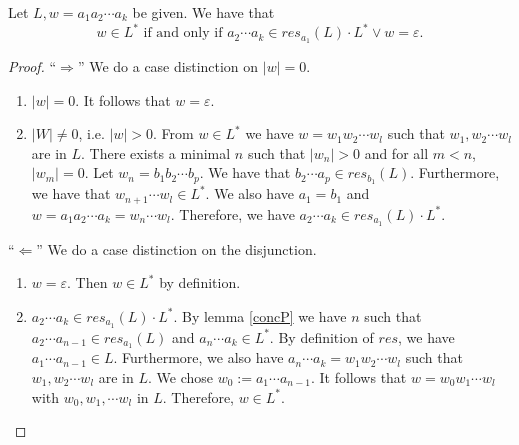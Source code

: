 
    \begin{lemma}
        \label{starP}
        Let $L, w = a_1 a_2 \cdots a_k$ be given. We have that
        \begin{equation*}
            w \in L^*   
            \mbox{ if and only if } 
            a_2 \cdots a_k \in res_{a_1}(L) \cdot L^* \vee w = \varepsilon.
        \end{equation*}
    \end{lemma}
    \begin{proof}
        ``$\Rightarrow$'' 
        We do a case distinction on $|w| = 0$.
        \begin{enumerate}
            \item
                $|w| = 0$. It follows that $w = \varepsilon$.
            \item
                $|W| \neq 0$, i.e. $|w| > 0$.
                From $w \in L^*$ we have $w = w_1 w_2 \cdots w_l$ such that $w_1, w_2 \cdots w_l$ are in $L$.
                There exists a minimal $n$ such that $|w_n| > 0$ and for all $m < n$, $|w_m| = 0$.
                Let $w_n = b_1 b_2 \cdots b_p$. We have that $b_2 \cdots a_p \in res_{b_1}(L)$.
                Furthermore, we have that $w_{n+1} \cdots w_l \in L^*$.
                We also have $a_1 = b_1$ and $w = a_1 a_2 \cdots a_k = w_n \cdots w_l$. 
                Therefore, we have $a_2 \cdots a_k \in res_{a_1}(L) \cdot L^*$.
        \end{enumerate}
        ``$\Leftarrow$'' 
        We do a case distinction on the disjunction.
        \begin{enumerate}
            \item
                $w = \varepsilon$. Then $w \in L^*$ by definition.
            \item
                $a_2 \cdots a_k \in res_{a_1}(L) \cdot L^*$. 
                By lemma \ref{concP} we have $n$ such that $a_2 \cdots a_{n-1} \in res_{a_1}(L)$ and $a_n \cdots a_k \in L^*$.
                By definition of $res$, we have $a_1 \cdots a_{n-1} \in L$.
                Furthermore, we also have $a_n \cdots a_k = w_1 w_2 \cdots w_l$ such that $w_1, w_2 \cdots w_l$ are in $L$.
                We chose $w_0 := a_1 \cdots a_{n-1}$.
                It follows that $w = w_0 w_1 \cdots w_l$ with $w_0, w_1, \cdots w_l$ in $L$.
                Therefore, $w \in L^*$.
        \end{enumerate}
    \end{proof}

